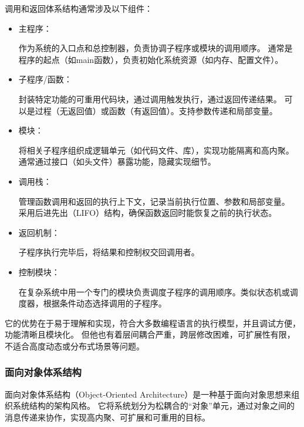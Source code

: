 \documentclass[12pt]{ctexart} %
\begin{document}
调用和返回体系结构通常涉及以下组件：
\begin{itemize}
  \item 主程序：

  作为系统的入口点和总控制器，负责协调子程序或模块的调用顺序。
  通常是程序的起点（如main函数），负责初始化系统资源（如内存、配置文件）。
  \item 子程序/函数：
  
  封装特定功能的可重用代码块，通过调用触发执行，通过返回传递结果。
  可以是过程（无返回值）或函数（有返回值）。支持参数传递和局部变量。
  \item 模块：
  
  将相关子程序组织成逻辑单元（如代码文件、库），实现功能隔离和高内聚。
  通常通过接口（如头文件）暴露功能，隐藏实现细节。
  \item 调用栈：
  
  管理函数调用和返回的执行上下文，记录当前执行位置、参数和局部变量。
  采用后进先出（LIFO）结构，确保函数返回时能恢复之前的执行状态。
  \item 返回机制：
  
  子程序执行完毕后，将结果和控制权交回调用者。
  \item 控制模块：
  
  在复杂系统中用一个专门的模块负责调度子程序的调用顺序。类似状态机或调度器，根据条件动态选择调用的子程序。
\end{itemize}

它的优势在于易于理解和实现，符合大多数编程语言的执行模型，并且调试方便，功能清晰且模块化。
但他也有着层间耦合严重，跨层修改困难，可扩展性有限，不适合高度动态或分布式场景等问题。

\subsubsection{面向对象体系结构}
面向对象体系结构（Object‑Oriented Architecture）是一种基于面向对象思想来组织系统结构的架构风格。
它将系统划分为松耦合的“对象”单元，通过对象之间的消息传递来协作，实现高内聚、可扩展和可重用的目标。
\end{document}
